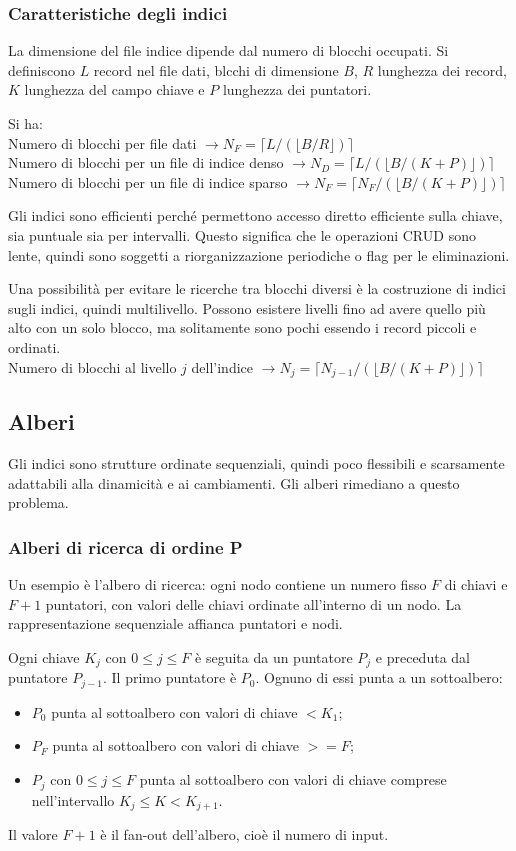 \subsubsection{Caratteristiche degli indici}
La dimensione del file indice dipende dal numero di blocchi occupati. Si definiscono $L$ record nel file dati, blcchi di dimensione $B$, $R$ lunghezza dei record, $K$ lunghezza del campo chiave e $P$ lunghezza dei puntatori.

Si ha: \\
Numero di blocchi per file dati $\rightarrow N_F = \lceil L/(\lfloor B/R \rfloor) \rceil$ \\
Numero di blocchi per un file di indice denso $\rightarrow N_D = \lceil L/(\lfloor B/(K+P) \rfloor) \rceil$ \\
Numero di blocchi per un file di indice sparso $\rightarrow N_F = \lceil N_F/(\lfloor B/(K+P) \rfloor) \rceil$

Gli indici sono efficienti perché permettono accesso diretto efficiente sulla chiave, sia puntuale sia per intervalli. Questo significa che le operazioni CRUD sono lente, quindi sono soggetti a riorganizzazione periodiche o flag per le eliminazioni.

Una possibilità per evitare le ricerche tra blocchi diversi è la costruzione di indici sugli indici, quindi multilivello. Possono esistere livelli fino ad avere quello più alto con un solo blocco, ma solitamente sono pochi essendo i record piccoli e ordinati. \\
Numero di blocchi al livello $j$ dell'indice $\rightarrow N_j = \lceil N_{j-1}/(\lfloor B/(K+P) \rfloor) \rceil$
 
\subsection{Alberi}
Gli indici sono strutture ordinate sequenziali, quindi poco flessibili e scarsamente adattabili alla dinamicità e ai cambiamenti. Gli alberi rimediano a questo problema.

\subsubsection{Alberi di ricerca di ordine P}
Un esempio è l'albero di ricerca: ogni nodo contiene un numero fisso $F$ di chiavi e $F + 1$ puntatori, con valori delle chiavi ordinate all'interno di un nodo. La rappresentazione sequenziale affianca puntatori e nodi.

Ogni chiave $K_j$ con $0 \leq j \leq F$ è seguita da un puntatore $P_j$ e preceduta dal puntatore $P_{j-1}$. Il primo puntatore è $P_0$. Ognuno di essi punta a un sottoalbero:
\begin{itemize}
	\item $P_0$ punta al sottoalbero con valori di chiave $< K_1$;
	\item $P_F$ punta al sottoalbero con valori di chiave $>= F$;
	\item $P_j$ con $0 \leq j \leq F$ punta al sottoalbero con valori di chiave comprese nell'intervallo $K_j \leq K < K_{j+1}$.
\end{itemize}
Il valore $F + 1$ è il fan-out dell'albero, cioè il numero di input.

